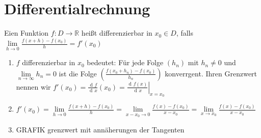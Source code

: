 \documentclass[a4paper,titlepage,oneside]{article}
\def\R{\ensuremath{\mathbb{R}} }
\newcommand{\der}{\operatorname{d\!}{}}
\renewcommand{\liminf}[2][n]{\ensuremath{\lim\limits_{#1 \rightarrow \infty}{#2}}}
\newcommand{\limnull}[2][n]{\ensuremath{\lim\limits_{#1 \rightarrow 0}{#2}}}
\newcommand{\limAB}[3][x]{\ensuremath{\lim\limits_{#1 \rightarrow #2}{#3}}}
\newcommand{\limA}[2][x_0]{\limAB{#1}{#2}}
\theoremstyle{thmstyle}
\begin{document}
\newpage
\section{Differentialrechnung}

\begin{defi}
Eien Funktion $f : D \to \R$ heißt differenzierbar in $x_0 \in D$, falls $\limnull[h]{\frac{f(x + h) - f(x_0)}{h}} = f'(x_0)$
\end{defi}

\begin{bem}
\begin{enumerate}
\item $f$ differenzierbar in $x_0$ bedeutet:  Für jede Folge $(h_n)$ mit $h_n \ne 0$ und $\liminf{h_n} = 0$ ist die Folge $\left(\frac{f(x_0 + h_n) - f(x_0)}{h_n}\right)$ konverrgent. Ihren Grenzwert nennen wir $f'(x_0) = \frac{\der f}{\der x}(x_0) = \left.\frac{\der f(x)}{\der x}\right|_{x = x_0}$
\item $f'(x_0) = \limnull[h]{\frac{f(x + h) - f(x_0)}{h}} = \limnull[x-x_0]{\frac{f(x) - f(x_0)}{x-x_0}} = \limA{\frac{f(x) - f(x_0)}{x-x_0}}$
\item GRAFIK grenzwert mit annäherungen der Tangenten
\end{enumerate}
\end{bem}
\end{document}
